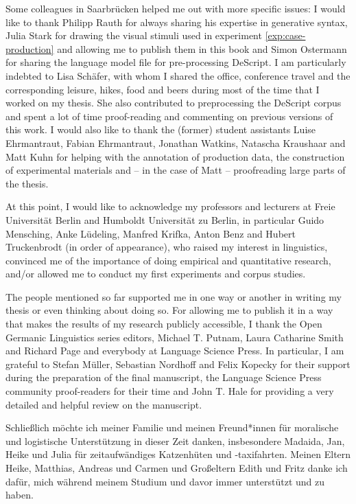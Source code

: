 Some colleagues in Saarbrücken helped me out with more specific issues: I would like to thank Philipp Rauth for always sharing his expertise in generative syntax, Julia Stark for drawing the visual stimuli used in experiment \ref{exp:case-production} and allowing me to publish them in this book and Simon Ostermann for sharing the language model file for pre-processing DeScript. I am particularly indebted to Lisa Schäfer, with whom I shared the office, conference travel and the corresponding leisure, hikes, food and beers during most of the time that I worked on my thesis. She also contributed to preprocessing the DeScript corpus and spent a lot of time proof-reading and commenting on previous versions of this work. I would also like to thank the (former) student assistants Luise Ehrmantraut, Fabian Ehrmantraut, Jonathan Watkins, Natascha Kraushaar and Matt Kuhn for helping with the annotation of production data, the construction of experimental materials and -- in the case of Matt -- proofreading large parts of the thesis.

At this point, I would like to acknowledge my professors and lecturers at Freie Universität Berlin and Humboldt Universität zu Berlin, in particular Guido Mensching, Anke Lüdeling, Manfred Krifka, Anton Benz and Hubert Truckenbrodt (in order of appearance), who raised my interest in linguistics, convinced me of the importance of doing empirical and quantitative research, and/or allowed me to conduct my first experiments and corpus studies.

The people mentioned so far supported me in one way or another in writing my thesis or even thinking about doing so. For allowing me to publish it in a way that makes the results of my research publicly accessible, I thank the Open Germanic Linguistics series editors, Michael T. Putnam, Laura Catharine Smith and Richard Page and everybody at Language Science Press. In particular, I am grateful to Stefan Müller, Sebastian Nordhoff and Felix Kopecky for their support during the preparation of the final manuscript, the Language Science Press community proof-readers for their time and John T. Hale for providing a very detailed and helpful review on the manuscript.

Schließlich möchte ich meiner Familie und meinen Freund*innen für morali\-sche und logistische Unterstützung in dieser Zeit danken, insbesondere Madaida, Jan, Heike und Julia für zeitaufwändiges Katzenhüten und -taxifahrten. Mei\-nen Eltern Heike, Matthias, Andreas und Carmen und Großeltern Edith und Fritz danke ich dafür, mich während meinem Studium und davor immer unterstützt und zu haben.